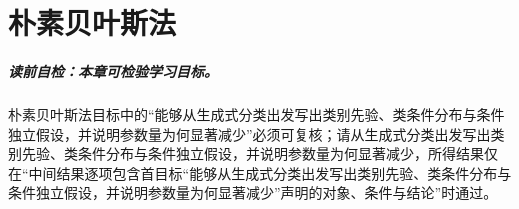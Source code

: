 
\chapter{朴素贝叶斯法}\label{chap:V2-C03}


\label{struct:V2-C03-CH01}
\paragraph{读前自检：本章可检验学习目标。}朴素贝叶斯法目标中的“能够从生成式分类出发写出类别先验、类条件分布与条件独立假设，并说明参数量为何显著减少”必须可复核；请从生成式分类出发写出类别先验、类条件分布与条件独立假设，并说明参数量为何显著减少，所得结果仅在“中间结果逐项包含首目标“能够从生成式分类出发写出类别先验、类条件分布与条件独立假设，并说明参数量为何显著减少”声明的对象、条件与结论”时通过。\par

